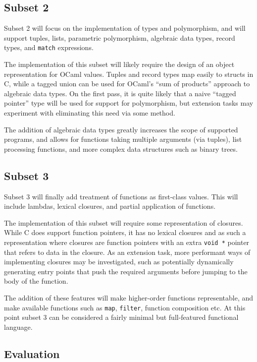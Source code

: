 \subsection*{Subset 2}

Subset 2 will focus on the implementation of types and polymorphism, and will
support tuples, lists, parametric polymorphism, algebraic data types, record
types, and \texttt{match} expressions.

The implementation of this subset will likely require the design of an object
representation for OCaml values. Tuples and record types map easily to structs
in C, while a tagged union can be used for OCaml's ``sum of products'' approach
to algebraic data types. On the first pass, it is quite likely that a naive
``tagged pointer'' type will be used for support for polymorphism, but
extension tasks may experiment with eliminating this need via some method.

The addition of algebraic data types greatly increases the scope of supported
programs, and allows for functions taking multiple arguments (via tuples), list
processing functions, and more complex data structures such as binary trees.

\subsection*{Subset 3}

Subset 3 will finally add treatment of functions as first-class values. This
will include lambdas, lexical closures, and partial application of functions.

The implementation of this subset will require some representation of closures.
While C does support function pointers, it has no lexical closures and as such
a representation where closures are function pointers with an extra
\texttt{void *} pointer that refers to data in the closure. As an extension
task, more performant ways of implementing closures may be investigated, such
as potentially dynamically generating entry points that push the required
arguments before jumping to the body of the function. 

The addition of these features will make higher-order functions representable,
and make available functions such as \texttt{map}, \texttt{filter}, function
composition etc. At this point subset 3 can be considered a fairly minimal but
full-featured functional language.

\subsection*{Evaluation}

